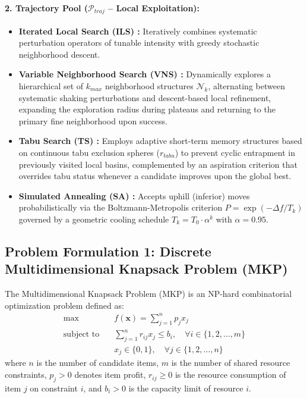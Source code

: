 \paragraph{2. Trajectory Pool ($\mathcal{P}_{traj}$ -- Local Exploitation):}
\begin{itemize}
    \item \textbf{Iterated Local Search (ILS) \cite{lourenco2003iterated}:} Iteratively combines systematic perturbation operators of tunable intensity with greedy stochastic neighborhood descent.
    \item \textbf{Variable Neighborhood Search (VNS) \cite{mladenovic1997variable}:} Dynamically explores a hierarchical set of $k_{max}$ neighborhood structures $\mathcal{N}_k$, alternating between systematic shaking perturbations and descent-based local refinement, expanding the exploration radius during plateaus and returning to the primary fine neighborhood upon success.
    \item \textbf{Tabu Search (TS) \cite{du2016tabu}:} Employs adaptive short-term memory structures based on continuous tabu exclusion spheres ($r_{tabu}$) to prevent cyclic entrapment in previously visited local basins, complemented by an aspiration criterion that overrides tabu status whenever a candidate improves upon the global best.
    \item \textbf{Simulated Annealing (SA) \cite{kirkpatrick1983optimization}:} Accepts uphill (inferior) moves probabilistically via the Boltzmann-Metropolis criterion $P = \exp(-\Delta f / T_k)$ governed by a geometric cooling schedule $T_k = T_0 \cdot \alpha^k$ with $\alpha = 0.95$.
\end{itemize}

\subsection{Problem Formulation 1: Discrete Multidimensional Knapsack Problem (MKP)}
\label{sec:mkp_formulation}

The Multidimensional Knapsack Problem (MKP) is an NP-hard combinatorial optimization problem defined as:
\begin{align}
\max \quad & f(\mathbf{x}) = \sum_{j=1}^{n} p_j x_j \label{eq:mkp_obj} \\
\text{subject to} \quad & \sum_{j=1}^{n} r_{ij} x_j \le b_i, \quad \forall i \in \{1, 2, \dots, m\} \label{eq:mkp_cons} \\
& x_j \in \{0, 1\}, \quad \forall j \in \{1, 2, \dots, n\} \label{eq:mkp_vars}
\end{align}
where $n$ is the number of candidate items, $m$ is the number of shared resource constraints, $p_j > 0$ denotes item profit, $r_{ij} \ge 0$ is the resource consumption of item $j$ on constraint $i$, and $b_i > 0$ is the capacity limit of resource $i$.

